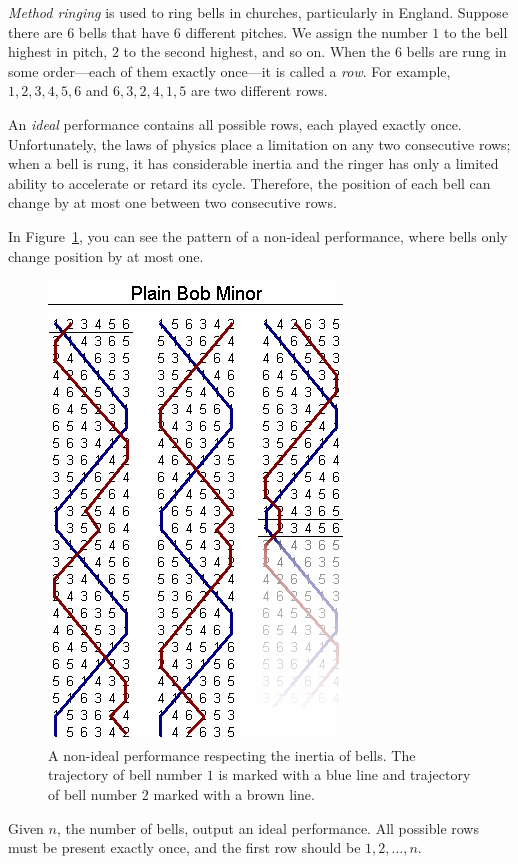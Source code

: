 
\emph{Method ringing} is used to ring bells in churches, particularly in England. Suppose there are
$6$ bells that have $6$ different pitches.
We assign the number $1$ to the bell highest in pitch, $2$ to the second highest, and so on.
When the $6$ bells are rung in some order---each of them exactly once---it is called a \emph{row}.
For example, $1, 2, 3, 4, 5, 6$ and $6, 3, 2, 4, 1, 5$ are two different rows.

An \emph{ideal} performance contains all possible rows, each played exactly once.
Unfortunately, the laws of physics place a limitation on any two consecutive rows;
when a bell is rung, it has considerable inertia and the ringer has
only a limited ability to accelerate or retard its cycle.
Therefore, the position of each bell can change by at most one between two consecutive rows.

In Figure~\ref{fig:bob}, you can see the pattern of a non-ideal performance, where
bells only change position by at most one.

\begin{figure}[h]
    \begin{center}
    \includegraphics[height=0.65\textwidth]{Plain-bob-minor}
    \caption{A non-ideal performance respecting the inertia of bells. The trajectory of bell number
    $1$ is marked with a blue line and trajectory of bell number $2$ marked with a brown line.}
    \end{center}
    \label{fig:bob}
\end{figure}

Given $n$, the number of bells, output an ideal performance. All possible rows must be present
exactly once, and the first row should be $1, 2, \dots, n$.


